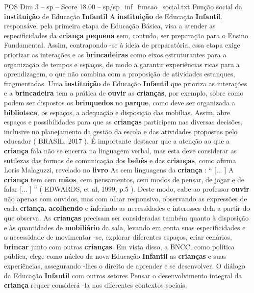 \begin{textsample}{POS Dim 3 – sp – Score 18.00 – sp/sp\_inf\_funcao\_social.txt}  \label{ex:f3_pos_203}
Função social da \textbf{instituição} de Educação \textbf{Infantil} A \textbf{instituição} de Educação \textbf{Infantil}, responsável pela primeira etapa de Educação Básica, visa a atender as especificidades da \textbf{criança} \textbf{pequena} sem, contudo, ser preparação para o Ensino Fundamental.
Assim, contrapondo -se à ideia de preparatória, essa etapa exige priorizar as interações e as \textbf{brincadeiras} como eixos estruturantes para a organização de tempos e espaços, de modo a garantir experiências ricas para a aprendizagem, o que não combina com a proposição de atividades estanques, fragmentadas.
Uma \textbf{instituição} de Educação \textbf{Infantil} que prioriza as interações e a \textbf{brincadeira} tem a prática de \textbf{ouvir} as \textbf{crianças}, por exemplo, sobre como podem ser dispostos os \textbf{brinquedos} no \textbf{parque}, como deve ser organizada a \textbf{biblioteca}, os espaços, a adequação e disposição das mobílias.
Assim, abre espaços e possibilidades para que as \textbf{crianças} participem nas diversas decisões, inclusive no planejamento da gestão da escola e das atividades propostas pelo educador ( BRASIL, 2017 ).
É importante destacar que a atenção ao que a \textbf{criança} fala não se encerra na linguagem verbal, mas esta deve considerar as sutilezas das formas de comunicação dos \textbf{bebês} e das \textbf{crianças}, como afirma Loris Malaguzzi, revelado no \textbf{livro} As cem linguagens da \textbf{criança} : “ [... ] A \textbf{criança} tem cem \textbf{mãos}, cem pensamentos, cem modos de pensar, de jogar e de falar [... ] ” ( EDWARDS, et al, 1999, p.5 ).
Deste modo, cabe ao professor \textbf{ouvir} não apenas com ouvidos, mas com olhar responsivo, observando as expressões de cada \textbf{criança}, \textbf{acolhendo} e inferindo as necessidades e interesses dela a partir do que observa.
As \textbf{crianças} precisam ser consideradas também quanto à disposição e às quantidades de \textbf{mobiliário} da sala, levando em conta suas especificidades e a necessidade de movimentar -se, explorar diferentes espaços, criar cenários, \textbf{brincar} junto com outras \textbf{crianças}.
Em vista disso, a BNCC, como política pública, elege como núcleo da nova Educação \textbf{Infantil} as \textbf{crianças} e suas experiências, assegurando -lhes o direito de aprender e se desenvolver.
O diálogo da Educação \textbf{Infantil} com outros setores Pensar o desenvolvimento integral da \textbf{criança} requer considerá -la nos diferentes contextos sociais.

\end{textsample}
